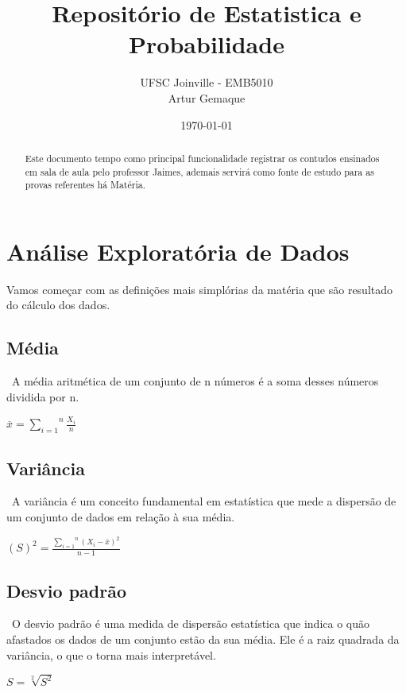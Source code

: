 \documentclass{article}
\title{\textbf{Repositório de Estatistica e Probabilidade}}
\author{UFSC Joinville - EMB5010 \\ Artur Gemaque}
\date{\today}
\begin{document}
\maketitle

\begin{abstract}
Este documento tempo como principal funcionalidade registrar os contudos ensinados 
em sala de aula pelo professor Jaimes, ademais servirá como fonte de estudo para as 
provas referentes há Matéria.
\end{abstract}

\section{Análise Exploratória de Dados}

    \begin{multicols}{2}
    
        Vamos começar com as definições mais simplórias da matéria que são resultado do cálculo dos dados.

        \subsection{Média}
        \ A média aritmética de um conjunto de n números é a soma desses números dividida por n.
          \begin{center}
            $ \overset{\_}{x} =  \overset{n}{\underset{i=1}{\sum}} \frac{X_i}{n}  $
          \end{center}

        \subsection{Variância}
        \ A variância é um conceito fundamental em estatística que mede a dispersão de um conjunto de dados em relação à sua média.
          \begin{center}
            $ (S)^2 =  \frac{\overset{n}{\underset{i=1}{\sum}} (X_i - \overset{\_}{x} )^2 }{n - 1} $
          \end{center}

        \subsection{Desvio padrão}
        \ O desvio padrão é uma medida de dispersão estatística que indica o quão afastados os 
        dados de um conjunto estão da sua média. Ele é a raiz quadrada da variância, o que o 
        torna mais interpretável.
          \begin{center}
            $ S = \sqrt[2]{S^2}$
          \end{center}


\end{multicols}
\end{document}

